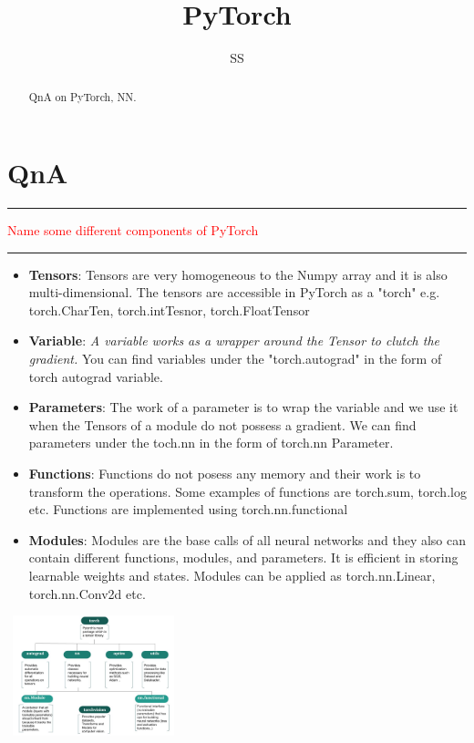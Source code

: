 \documentclass{article}
\title{PyTorch}
\author{SS}
\begin{document}
\maketitle

\begin{abstract}
QnA on PyTorch, NN.
\end{abstract}

\section{QnA}
% 
\noindent
{\color{red} \rule{\linewidth}{0.5mm}}
\textcolor{red}{Name some different components of PyTorch} \\
\noindent
{\color{red} \rule{\linewidth}{0.5mm}}

\begin{itemize}
\color{blue}
\item \textbf{Tensors}: Tensors are very homogeneous to the Numpy array and it is also multi-dimensional. The tensors are accessible in PyTorch as a "torch" e.g. torch.CharTen, torch.intTesnor, torch.FloatTensor
\item \textbf{Variable}: \textit{A variable works as a wrapper around the Tensor to clutch the gradient.} You can find variables under the "torch.autograd" in the form of torch autograd variable.
\item \textbf{Parameters}: The work of a parameter is to wrap the variable and we use it when the Tensors of a module do not possess a gradient. We can find parameters under the toch.nn in the form of torch.nn Parameter.
\item \textbf{Functions}: Functions do not posess any memory and their work is to transform the operations. Some examples of functions are torch.sum, torch.log etc. Functions are implemented using torch.nn.functional
\item \textbf{Modules}: Modules are the base calls of all neural networks and they also can contain different functions, modules, and parameters. It is efficient in storing learnable weights and states. Modules can be applied as torch.nn.Linear, torch.nn.Conv2d etc.
\end{itemize}
\includegraphics[width=5cm, height=3.5cm]{LSTM/images/Pytorch-package-hierarchy.jpg}
\end{document}
